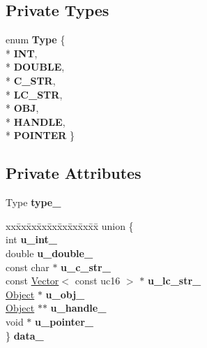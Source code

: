 \subsection*{Private Types}
\begin{DoxyCompactItemize}
\item 
enum {\bfseries Type} \{ \\*
{\bfseries I\+NT}, 
\\*
{\bfseries D\+O\+U\+B\+LE}, 
\\*
{\bfseries C\+\_\+\+S\+TR}, 
\\*
{\bfseries L\+C\+\_\+\+S\+TR}, 
\\*
{\bfseries O\+BJ}, 
\\*
{\bfseries H\+A\+N\+D\+LE}, 
\\*
{\bfseries P\+O\+I\+N\+T\+ER}
 \}\hypertarget{classv8_1_1internal_1_1_fmt_elm_a50dc8f0f31174c1fa802eb702d510393}{}\label{classv8_1_1internal_1_1_fmt_elm_a50dc8f0f31174c1fa802eb702d510393}

\end{DoxyCompactItemize}
\subsection*{Private Attributes}
\begin{DoxyCompactItemize}
\item 
Type {\bfseries type\+\_\+}\hypertarget{classv8_1_1internal_1_1_fmt_elm_ac7e38baea41b36a267b6839f561a99cb}{}\label{classv8_1_1internal_1_1_fmt_elm_ac7e38baea41b36a267b6839f561a99cb}

\item 
\begin{tabbing}
xx\=xx\=xx\=xx\=xx\=xx\=xx\=xx\=xx\=\kill
union \{\\
\>int {\bfseries u\_int\_}\\
\>double {\bfseries u\_double\_}\\
\>const char $\ast$ {\bfseries u\_c\_str\_}\\
\>const \hyperlink{classv8_1_1internal_1_1_vector}{Vector}$<$ const uc16 $>$ $\ast$ {\bfseries u\_lc\_str\_}\\
\>\hyperlink{classv8_1_1internal_1_1_object}{Object} $\ast$ {\bfseries u\_obj\_}\\
\>\hyperlink{classv8_1_1internal_1_1_object}{Object} $\ast$$\ast$ {\bfseries u\_handle\_}\\
\>void $\ast$ {\bfseries u\_pointer\_}\\
\} {\bfseries data\_}\hypertarget{classv8_1_1internal_1_1_fmt_elm_a393bcf9e828fbc95303c27e9c831daf0}{}\label{classv8_1_1internal_1_1_fmt_elm_a393bcf9e828fbc95303c27e9c831daf0}
\\

\end{tabbing}\end{DoxyCompactItemize}
